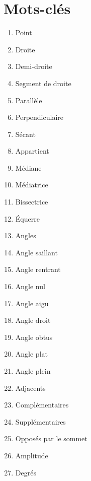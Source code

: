 \documentclass[../../syllabus_1.tex]{subfiles}
\begin{document}
\section*{Mots-clés}
\begin{enumerate}[cols=2, label=\textbf{\arabic*.}]
    \item Point
    \item Droite
    \item Demi-droite
    \item Segment de droite
    \item Parallèle
    \item Perpendiculaire
    \item Sécant
    \item Appartient
    \item Médiane
    \item Médiatrice
    \item Bissectrice
    \item Équerre
    \item Angles
    \item Angle saillant
    \item Angle rentrant
    \item Angle nul
    \item Angle aigu
    \item Angle droit
    \item Angle obtus
    \item Angle plat
    \item Angle plein
    \item Adjacents
    \item Complémentaires
    \item Supplémentaires
    \item Opposés par le sommet
    \item Amplitude
    \item Degrés
\end{enumerate}
\end{document}
